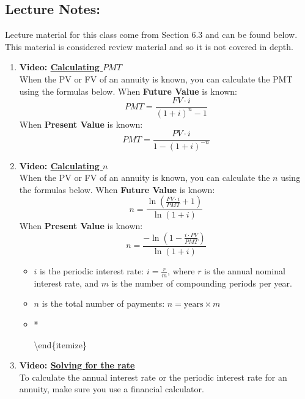\documentclass[
]{book}
\providecommand{\tightlist}{%
  \setlength{\itemsep}{0pt}\setlength{\parskip}{0pt}}
\begin{document}
\subsection*{Lecture Notes:}\label{lecture-notes-13}

Lecture material for this class come from Section 6.3 and can be found below. This material is considered review material and so it is not covered in depth.

\begin{enumerate}
\def\labelenumi{\arabic{enumi}.}
\setcounter{enumi}{4}
\tightlist
\item
  \textbf{Video: \href{https://youtu.be/WV62y3hfJm03}{Calculating \(PMT\)}}\\
  When the PV or FV of an annuity is known, you can calculate the PMT using the formulas below.
  When \textbf{Future Value} is known:
  \[
   PMT = \frac{FV \cdot i}{(1 + i)^n - 1}
   \]
  When \textbf{Present Value} is known:
  \[
   PMT = \frac{PV \cdot i}{1 - (1 + i)^{-n}}
   \]
\item
  \textbf{Video: \href{https://youtu.be/K-wqThNzu2A}{Calculating \(n\)}}\\
  When the PV or FV of an annuity is known, you can calculate the \(n\) using the formulas below.
  When \textbf{Future Value} is known:
  \[
   n = \frac{\ln\left(\frac{FV \cdot i}{PMT} + 1\right)}{\ln(1 + i)}
   \]
  When \textbf{Present Value} is known:
  \[
   n = \frac{-\ln\left(1-\frac{i \cdot PV}{PMT}\right)}{\ln(1 + i)}
   \]

  \begin{itemize}
  \tightlist
  \item
    \(i\) is the periodic interest rate: \(i = \frac{r}{m}\), where \(r\) is the annual nominal interest rate, and \(m\) is the number of compounding periods per year.
  \item
    \(n\) is the total number of payments: \(n = \text{years} \times m\)

    \item    *

    \textbackslash end\{itemize\}
  \end{itemize}
\item
  \textbf{Video: \href{https://youtu.be/eIW1nf-UtkI}{Solving for the rate}}\\
  To calculate the annual interest rate or the periodic interest rate for an annuity, make sure you use a financial calculator.
\end{enumerate}
\end{document}

